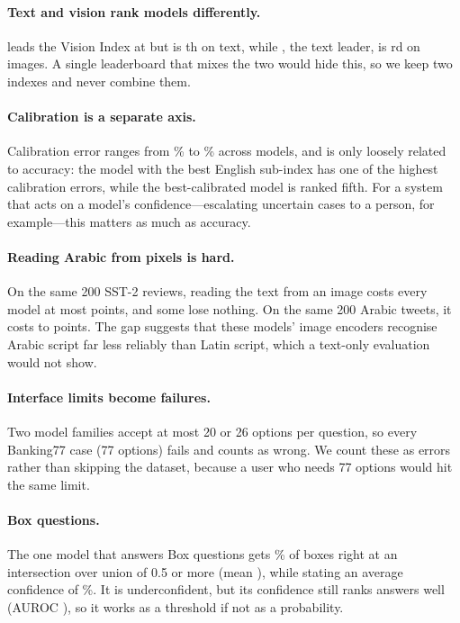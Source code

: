 \documentclass[11pt]{article}
\begin{document}
\paragraph{Text and vision rank models differently.} \topVision{} leads the Vision Index at \topVisionIdx{} but is
\topVisionTextRank{}th on text, while \topText{}, the text leader, is \topTextVisionRank{}rd on images. A single
leaderboard that mixes the two would hide this, so we keep two indexes and never combine them.

\paragraph{Calibration is a separate axis.} Calibration error ranges from \eceMin{}\% to \eceMax{}\% across models,
and is only loosely related to accuracy: the model with the best English sub-index has one of the highest
calibration errors, while the best-calibrated model is ranked fifth. For a system that acts on a model's
confidence---escalating uncertain cases to a person, for example---this matters as much as accuracy.

\paragraph{Reading Arabic from pixels is hard.} On the same 200 SST-2 reviews, reading the text from an image costs
every model at most \enGapWorst{} points, and some lose nothing. On the same 200 Arabic tweets, it costs \arGapBest{}
to \arGapWorst{} points. The gap suggests that these models' image encoders recognise Arabic script far less
reliably than Latin script, which a text-only evaluation would not show.

\paragraph{Interface limits become failures.} Two model families accept at most 20 or 26 options per question, so
every Banking77 case (77 options) fails and counts as wrong. We count these as errors rather than skipping the
dataset, because a user who needs 77 options would hit the same limit.

\paragraph{Box questions.} The one model that answers Box questions gets \boxRight{}\% of boxes right at an
intersection over union of 0.5 or more (mean \boxIou{}), while stating an average confidence of \boxConf{}\%. It is
underconfident, but its confidence still ranks answers well (AUROC \boxAuroc{}), so it works as a threshold if not as a
probability.
\end{document}
